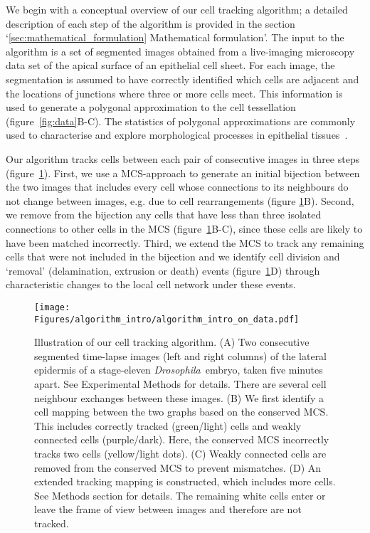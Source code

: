 \documentclass[a4paper,11pt]{article}
\newcommand{\Drosophila}{\textit{Drosophila}~}
\begin{document}
We begin with a conceptual overview of our cell tracking algorithm; a detailed description of each step of the algorithm is provided in the section `\ref{sec:mathematical_formulation} Mathematical formulation'.
The input to the algorithm is a set of segmented images obtained from a live-imaging microscopy data set of the apical surface of an epithelial cell sheet. 
For each image, the segmentation is assumed to have correctly identified which cells are adjacent and the locations of junctions where three or more cells meet. This information is used to generate a polygonal approximation to the cell tessellation (figure~\ref{fig:data}B-C). 
The statistics of polygonal approximations are commonly used to characterise and explore morphological processes in epithelial tissues~\cite{Farhadifar2007, Cilla2015, Escudero2011, Sanchez-Gutierrez2015,Saez2013}. 

Our algorithm tracks cells between each pair of consecutive images in three steps (figure~\ref{fig:methods}). 
First, we use a MCS-approach \cite{Ullmann1976,Krissinel2004} to generate an initial bijection between the two images that includes every cell whose connections to its neighbours do not change between images, e.g. due to cell rearrangements (figure \ref{fig:methods}B). 
Second, we remove from the bijection any cells that have less than three isolated connections to other cells in the MCS (figure~\ref{fig:methods}B-C), since these cells are likely to have been matched incorrectly.
Third, we extend the MCS to track any remaining cells that were not included in the bijection and we  identify cell division and `removal' (delamination, extrusion or death) events (figure~\ref{fig:methods}D) through characteristic changes to the local cell network under these events.

\begin{figure}[ht!]
\centering
\texttt{[image: Figures/algorithm\_intro/algorithm\_intro\_on\_data.pdf]}
\caption{Illustration of our cell tracking algorithm. 
(A) Two consecutive segmented time-lapse images (left and right columns) of the lateral epidermis of a stage-eleven \Drosophila embryo, taken five minutes apart. 
See Experimental Methods for details.
There are several cell neighbour exchanges between these images. 
(B) We first identify a cell mapping between the two graphs based on the conserved MCS. 
This includes correctly tracked (green/light) cells and weakly connected cells (purple/dark). 
Here, the conserved MCS incorrectly tracks two cells (yellow/light dots). 
(C) Weakly connected cells are removed from the conserved MCS to prevent mismatches. 
(D) An extended tracking mapping is constructed, which includes more cells. 
See Methods section for details. 
The remaining white cells enter or leave the frame of view between images and therefore are not tracked.}
\label{fig:methods}
\end{figure}
\end{document}

